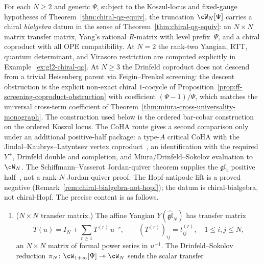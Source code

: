 \begin{theorem}
\label{thm:glN-chiral-qg}
\ClaimStatusConditional
For each $N \geq 2$ and generic $\Psi$, subject to the
Koszul-locus and fixed-gauge hypotheses of
Theorem~\textup{\ref{thm:chiral-qg-equiv}}, the truncation
$\cW_N[\Psi]$ carries a chiral \emph{bialgebra} datum in
the sense of
Theorem~\textup{\ref{thm:chiral-qg-equiv}}: an $N \times N$
matrix transfer matrix, Yang's rational $R$-matrix with
level prefix~$\Psi$, and a chiral coproduct with all
OPE compatibility.
At $N = 2$ the rank-two Yangian, RTT, quantum determinant, and
Virasoro restriction are computed explicitly in
Example~\ref{ex:gl2-chiral-qg}. At $N \geq 3$ the Drinfeld
coproduct does not descend from a trivial Heisenberg parent
via Feigin--Frenkel screening: the descent obstruction is
the explicit non-exact chiral $1$-cocycle of
Proposition~\ref{prop:ff-screening-coproduct-obstruction}
with coefficient $(\Psi - 1)/\Psi$, which matches the
universal cross-term coefficient of
Theorem~\ref{thm:miura-cross-universality-monograph}. The
construction used below is the ordered bar-cobar construction
on the ordered Koszul locus. The CoHA route gives a second comparison
only under an additional positive-half package: a type-$A$
critical CoHA with the Jindal--Kaubrys--Latyntsev vertex
coproduct~\textup{\cite{JKL26}}, an identification with the
required $Y^+$, Drinfeld double and completion, and
Miura/Drinfeld--Sokolov evaluation to $\cW_N$. The
Schiffmann--Vasserot Jordan-quiver theorem supplies the
$\mathfrak{gl}_1$ positive half~\textup{\cite{SV13}}, not a
rank-$N$ Jordan-quiver proof. The Hopf-antipode lift is a proved negative
\textup{(}Remark~\ref{rem:chiral-bialgebra-not-hopf}\textup{)};
the datum is chiral-bialgebra, not chiral-Hopf.
The precise content is as follows.
\begin{enumerate}[label=\textup{(\Roman*)}]
\item \textup{($N \times N$ transfer matrix.)}
 The affine Yangian $Y(\widehat{\mathfrak{gl}}_N)$ has
 transfer matrix
 \begin{equation}\label{eq:glN-transfer}
 T(u)
 = I_N + \sum_{r \geq 1} T^{(r)}\, u^{-r},
 \qquad
 (T^{(r)})_{ij} = t_{ij}^{(r)},
 \quad 1 \leq i,j \leq N,
 \end{equation}
 an $N \times N$ matrix of formal power series in
 $u^{-1}$. The Drinfeld--Sokolov reduction
 $\pi_N \colon \cW_{1+\infty}[\Psi]
 \twoheadrightarrow \cW_N$ sends the scalar transfer

\end{enumerate}
\end{theorem}
